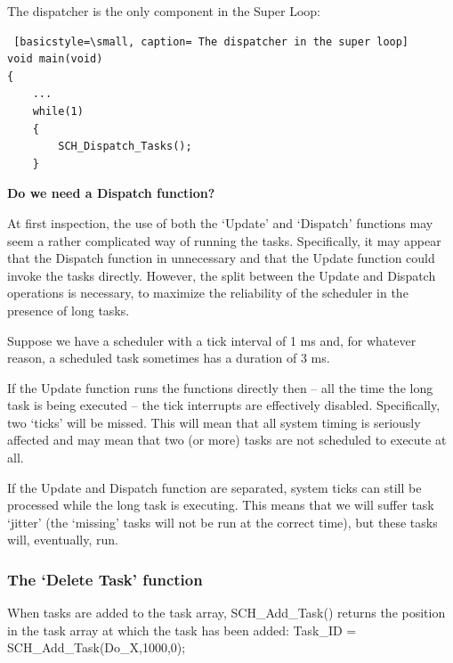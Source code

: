 \documentclass[twoside, final]{hcmut_report}
\begin{document}
The dispatcher is the only component in the Super Loop:
\begin{lstlisting} [basicstyle=\small, caption= The dispatcher in the super loop]
void main(void)
{
    ...
    while(1)
    {
        SCH_Dispatch_Tasks();
    }
\end{lstlisting}

\textbf{Do we need a Dispatch function?}

At first inspection, the use of both the ‘Update’ and ‘Dispatch’ functions may seem a
rather complicated way of running the tasks. Specifically, it may appear that the
Dispatch function in unnecessary and that the Update function could invoke the
tasks directly. However, the split between the Update and Dispatch operations is necessary, to maximize the reliability of the scheduler in the presence of long tasks.

Suppose we have a scheduler with a tick interval of 1 ms and, for whatever reason,
a scheduled task sometimes has a duration of 3 ms.

If the Update function runs the functions directly then – all the time the long task
is being executed – the tick interrupts are effectively disabled. Specifically, two ‘ticks’
will be missed. This will mean that all system timing is seriously affected and may
mean that two (or more) tasks are not scheduled to execute at all.

If the Update and Dispatch function are separated, system ticks can still be processed
while the long task is executing. This means that we will suffer task ‘jitter’ (the ‘missing’
tasks will not be run at the correct time), but these tasks will, eventually, run.

\subsubsection{The ‘Delete Task’ function}
When tasks are added to the task array, SCH\_Add\_Task() returns the position in the
task array at which the task has been added:
Task\_ID = SCH\_Add\_Task(Do\_X,1000,0);
\end{document}
